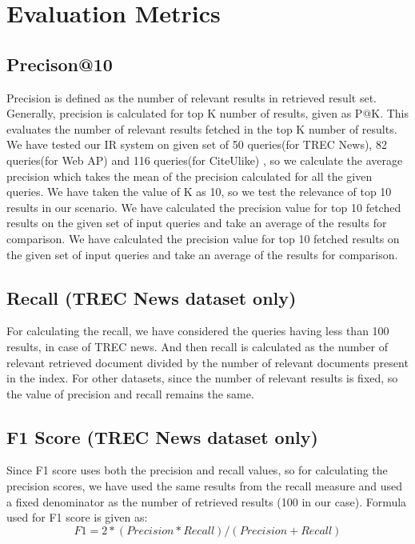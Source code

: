 \section{Evaluation Metrics}
\subsection{Precison@10}
Precision is defined as the number of relevant results in retrieved result set. Generally, precision is calculated for top K number of results, given as P@K. This evaluates the number of relevant results fetched in the top K number of results. We have tested our IR system on given set of 50 queries(for TREC News), 82 queries(for Web AP) and 116 queries(for CiteUlike) , so we calculate the average precision which takes the mean of the precision calculated for all the given queries. We have taken the value of K as 10, so we test the relevance of top 10 results in our scenario. We have calculated the precision value for top 10 fetched results on the given set of input queries and take an average of the results for comparison.
We have calculated the precision value for top 10 fetched results on the given set of input queries and take an average of the results for comparison.

\subsection{Recall (TREC News dataset only)}
For calculating the recall, we have considered the queries having less than 100 results, in case of TREC news. And then recall is calculated as the number of relevant retrieved document divided by the number of relevant documents present in the index. For other datasets, since the number of relevant results is fixed, so the value of precision and recall remains the same.

\subsection{F1 Score (TREC News dataset only)}
Since F1 score uses both the precision and recall values, so for calculating the precision scores, we have used the same results from the recall measure and used a fixed denominator as the number of retrieved results (100 in our case). Formula used for F1 score is given as:
	\begin{equation}
	    F1= 2*(Precision*Recall)/(Precision+Recall)
	\end{equation}
   
